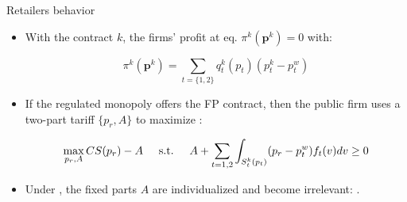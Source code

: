 \documentclass{class}
\begin{document}
\begin{frame}{Retailers behavior}

\begin{itemize}
    \item With the contract $k$, the firms' profit at eq. $ \pi^k(\textbf{p}^{k}) = 0$ with:

\vfill

\begin{equation*}
 \pi^k(\textbf{p}^{k}) = \sum_{t =\{1,2\}} q^k_t(p_t)(p^k_t - p_t^w)
\end{equation*}

\vfill

\item If the regulated monopoly offers the FP contract, then the public firm uses a two-part tariff $\{p_r,A\}$ to maximize :

\vfill

\begin{equation*}
 \max_{p_r,A} CS(p_r) - A \hspace{0.5cm} \text{s.t.} \hspace{0.5cm} A + \sum_{t=1,2} \int_{S_t^k(p_t)} (p_r-p_t^w)f_t(v)dv\geq 0
\end{equation*}

\vfill

\item Under , the fixed parts $A$ are individualized and become irrelevant: . 


\end{itemize}

    
\end{frame}






\end{document}
